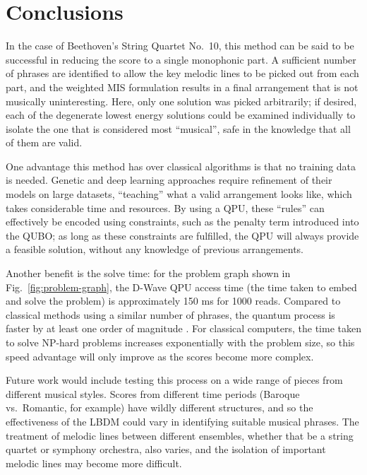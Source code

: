 \documentclass[aps,pra,12pt,onecolumn]{revtex4-2}
\begin{document}
\section{Conclusions}

In the case of Beethoven's String Quartet No.\ 10, this method can be said to be successful in reducing the score to a single monophonic part. A sufficient number of phrases are identified to allow the key melodic lines to be picked out from each part, and the weighted MIS formulation results in a final arrangement that is not musically uninteresting. Here, only one solution was picked arbitrarily; if desired, each of the degenerate lowest energy solutions could be examined individually to isolate the one that is considered most ``musical'', safe in the knowledge that all of them are valid.

One advantage this method has over classical algorithms is that no training data is needed. Genetic and deep learning approaches require refinement of their models on large datasets, ``teaching'' what a valid arrangement looks like, which takes considerable time and resources. By using a QPU, these ``rules'' can effectively be encoded using constraints, such as the penalty term introduced into the QUBO; as long as these constraints are fulfilled, the QPU will always provide a feasible solution, without any knowledge of previous arrangements.

Another benefit is the solve time: for the problem graph shown in Fig.\ \ref{fig:problem-graph}, the D-Wave QPU access time (the time taken to embed and solve the problem) is approximately \num{150} \unit{\ms} for 1000 reads. Compared to classical methods using a similar number of phrases, the quantum process is faster by at least one order of magnitude \cite{huang_towards_2012}. For classical computers, the time taken to solve NP-hard problems increases exponentially with the problem size, so this speed advantage will only improve as the scores become more complex.

Future work would include testing this process on a wide range of pieces from different musical styles. Scores from different time periods (Baroque vs.\ Romantic, for example) have wildly different structures, and so the effectiveness of the LBDM could vary in identifying suitable musical phrases. The treatment of melodic lines between different ensembles, whether that be a string quartet or symphony orchestra, also varies, and the isolation of important melodic lines may become more difficult.
\end{document}

